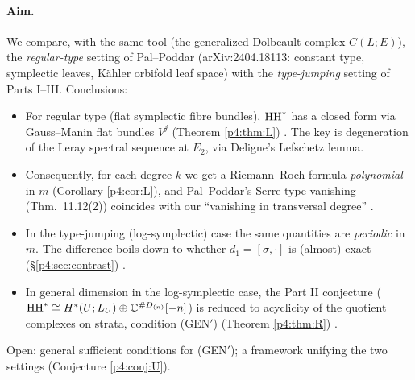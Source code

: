 \paragraph{Aim.}
We compare, with the same tool (the generalized Dolbeault complex $C(L;E)$), the \emph{regular-type} setting of Pal--Poddar (arXiv:2404.18113: constant type, symplectic leaves, Kähler orbifold leaf space) with the \emph{type-jumping} setting of Parts I--III. Conclusions:
\begin{itemize}
\item For regular type (flat symplectic fibre bundles), $\mathrm{HH}^*$ has a closed form via Gauss--Manin flat bundles $V^j$ (Theorem \ref{p4:thm:L}) \tP. The key is degeneration of the Leray spectral sequence at $E_2$, via Deligne's Lefschetz lemma.
\item Consequently, for each degree $k$ we get a Riemann--Roch formula \emph{polynomial} in $m$ (Corollary \ref{p4:cor:L}), and Pal--Poddar's Serre-type vanishing (Thm.\ 11.12(2)) coincides with our ``vanishing in transversal degree'' \tP.
\item In the type-jumping (log-symplectic) case the same quantities are \emph{periodic} in $m$. The difference boils down to whether $d_1=[\sigma,\cdot]$ is (almost) exact (\S\ref{p4:sec:contrast}) \tP\tV.
\item In general dimension in the log-symplectic case, the Part II conjecture ($\mathrm{HH}^*\cong H^*(U;L_U)\oplus\mathbb C^{\#D_{(n)}}[-n]$) is reduced to acyclicity of the quotient complexes on strata, condition (GEN$'$) (Theorem \ref{p4:thm:R}) \tP.
\end{itemize}
Open: general sufficient conditions for (GEN$'$); a framework unifying the two settings (Conjecture \ref{p4:conj:U}).

